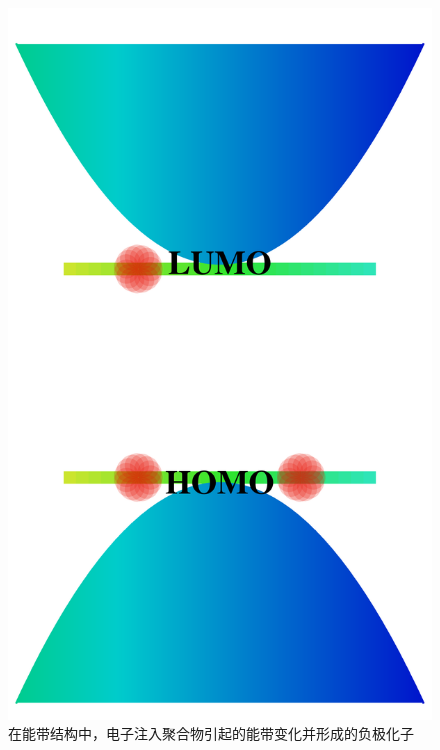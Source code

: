\documentclass[12pt,]{report}
\begin{document}
\begin{figure}[h!]
    \centering
    \includegraphics[scale=0.09]{./figures/polaron0.png}
    \caption{在能带结构中，电子注入聚合物引起的能带变化并形成的负极化子}
    \label{fig:npolaron}
\end{figure}
\end{document}
